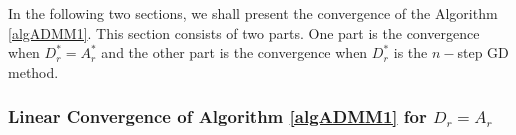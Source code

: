 
In the following two sections, we shall present the convergence of the Algorithm \ref{algADMM1}. This section consists of two parts. One part is the convergence when $D_r^* = A_r^*$ and the other part is the convergence when $D_r^*$ is the $n-$step GD method. 

\subsubsection{Linear Convergence of Algorithm \ref{algADMM1} for $D_r = A_r$}

